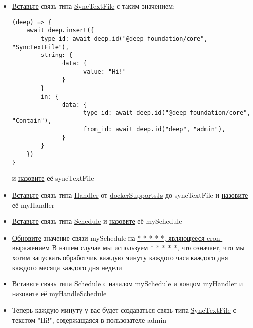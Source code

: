 \begin{itemize}
      \item \hyperlink{DeepCase.InsertLink.Description}{Вставьте} связь типа
            \hyperlink{Core.SyncTextFile.Description}{SyncTextFile} с таким
            значением:
            \begin{lstlisting}
(deep) => {
    await deep.insert({
        type_id: await deep.id("@deep-foundation/core", "SyncTextFile"),
        string: {
              data: {
                    value: "Hi!"
              }
        }
        in: {
              data: {
                    type_id: await deep.id("@deep-foundation/core", "Contain"),
                    from_id: await deep.id("deep", "admin"),
              }
        }
    })
}
    \end{lstlisting}
            и \hyperlink{FAQ.HowToSetName}{назовите} её syncTextFile
      \item \hyperlink{DeepCase.InsertLink.Description}{Вставьте} связь типа
            \hyperlink{Core.Handler.Description}{Handler} от
            \hyperlink{Core.dockerSupportsJs.Description}{dockerSupportsJs}
            до syncTextFile и \hyperlink{FAQ.HowToSetName}{назовите} её
            myHandler
      \item \hyperlink{DeepCase.InsertLink.Description}{Вставьте} связь
            типа \hyperlink{Core.Schedule.Description}{Schedule} и
            \hyperlink{FAQ.HowToSetName}{назовите} её mySchedule
      \item \hyperlink{DeepCase.UpdateLink.Description}{Обновите}
            значение связи mySchedule на
            \hyperlink{Handler.Schedule.CronExpression.Description}{* * * * *,
                  являющееся
                  cron-выражением}
            В нашем случае мы используем * * * * *, что означает, что мы хотим
            запускать обработчик каждую минуту каждого часа каждого дня каждого
            месяца
            каждого дня недели
      \item \hyperlink{DeepCase.InsertLink.Description}{Вставьте} связь
            типа \hyperlink{Core.HandleSchedule.Description}{Schedule} с
            началом mySchedule
            и концом myHandler	и \hyperlink{FAQ.HowToSetName}{назовите} её
            myHandleSchedule
      \item Теперь каждую минуту у вас будет создаваться связь типа
            \hyperlink{Core.SyncTextFile.Description}{SyncTextFile} с текстом
            "Hi!",
            содержащаяся в пользователе admin
\end{itemize}

